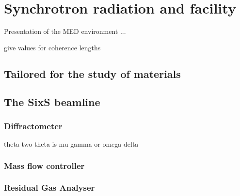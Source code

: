 \section{Synchrotron radiation and facility} \label{sec:SIXS}

Presentation of the MED environment ... 

give values for coherence lengths

\subsection{Tailored for the study of materials}

\subsection{The SixS beamline}

\subsubsection{Diffractometer}
theta two theta is mu gamma or omega delta

\subsubsection{Mass flow controller}

\subsubsection{Residual Gas Analyser}

